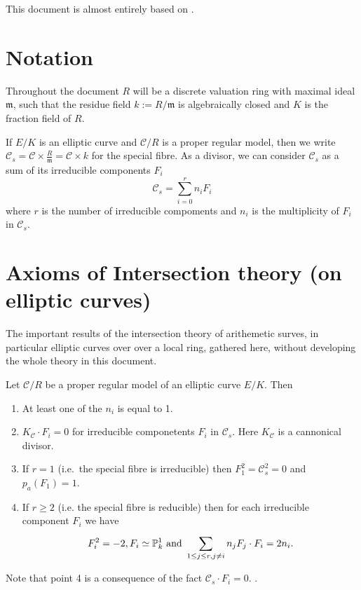 This document is almost entirely based on \cite[][\S 8]{silvermanAdvancedTopicsArithmetic1994}.

\section{Notation} \label{sec:notation}

Throughout the document $R$ will be a discrete valuation ring with maximal ideal $\mathfrak{m} $, such that the residue field $k := R / \mathfrak{m} $ is algebraically closed and $K$ is the fraction field of $R$. 

If $E / K$ is an elliptic curve and $\mathcal{C}  / R$ is a proper regular model, then we write $\mathcal{C} _s = \mathcal{C}  \times \frac{R}{\mathfrak{m} } = \mathcal{C} \times k $ for the special fibre. 
As a divisor, we can consider $\mathcal{C}_s$ as a sum of its irreducible components $F_i$ 
\begin{equation}\label{eq:decomposition_fibre}
	\mathcal{C}_s = \sum_{i = 0}^{r} n_i F_i
\end{equation}
where $r$ is the number of irreducible compoments and $n_i$ is the multiplicity of $F_i$ in $\mathcal{C} _s$. 

\section{Axioms of Intersection theory (on elliptic curves)} \label{sec:axioms_of_intersection_theory}

The important results of the intersection theory of arithemetic surves, in particular elliptic curves over over a local ring, gathered here, without developing the whole theory in this document. 

\begin{proposition}
	\label{prop:irred_comp_of_prop_model}
	Let $\mathcal{C} / R$  be a proper regular model of an elliptic curve $E / K$. Then 
	\begin{enumerate}
		\item At least one of the $n_i$ is equal to 1. 
		\item $K_{\mathcal{C} } \cdot F_i = 0 $ for irreducible componetents $F_i$ in $\mathcal{C} _s$. 
			Here $K_{\mathcal{C} }$ is a cannonical divisor. 
		\item If $r = 1$ (i.e.\ the special fibre is irreducible) then $F_1^2 = \mathcal{C} _s^2 = 0$ and $p_a (F_1) = 1$. 
		\item If $r \ge 2$ (i.e. the special fibre is reducible) then for each irreducible component $F_i$ we have \[
		F_i^2 = -2, F_i \simeq \mathbb{P}^{1}_k \text{ and } \sum_{1 \le j \le r, j \ne i}^{} n_j F_j\cdot  F_i = 2 n_i
		.\]   
	\end{enumerate}
\end{proposition}
Note that point 4 is a consequence of the fact $\mathcal{C} _s \cdot F_i = 0$.  .



